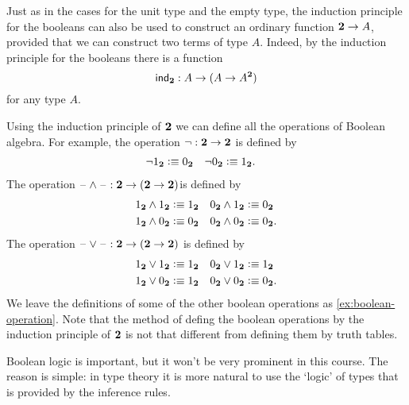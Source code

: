 Just as in the cases for the unit type and the empty type, the induction principle for the booleans can also be used to construct an ordinary function $\bool\to A$, provided that we can construct two terms of type $A$. Indeed, by the induction principle for the booleans there is a function
\begin{equation*}
  \indbool : A \to (A\to A^\bool)
\end{equation*}
for any type $A$.

\begin{eg}
  Using the induction principle of $\bool$ we can define all the operations of Boolean algebra. For example, the  operation $\neg : \bool \to \bool$ is defined by
  \begin{align*}
    \neg\btrue & \defeq \bfalse & \neg\bfalse & \defeq \btrue.
  \end{align*}
  The  operation $\blank\land\blank : \bool \to (\bool\to \bool)$is defined by
  \begin{align*}
    \btrue\land\btrue & \defeq \btrue & \bfalse\land\btrue & \defeq \bfalse \\
    \btrue\land\bfalse & \defeq \bfalse & \bfalse\land\bfalse & \defeq \bfalse.
  \end{align*}
  The  operation $\blank\lor\blank : \bool \to (\bool\to \bool)$ is defined by
  \begin{align*}
    \btrue\lor\btrue & \defeq \btrue & \bfalse\lor\btrue & \defeq \btrue \\
    \btrue\lor\bfalse & \defeq \btrue & \bfalse\lor\bfalse & \defeq \bfalse.
  \end{align*}  
  We leave the definitions of some of the other boolean operations as \cref{ex:boolean-operation}. Note that the method of defing the boolean operations by the induction principle of $\bool$ is not that different from defining them by truth tables.

  Boolean logic is important, but it won't be very prominent in this course. The reason is simple: in type theory it is more natural to use the `logic' of types that is provided by the inference rules.
\end{eg}

